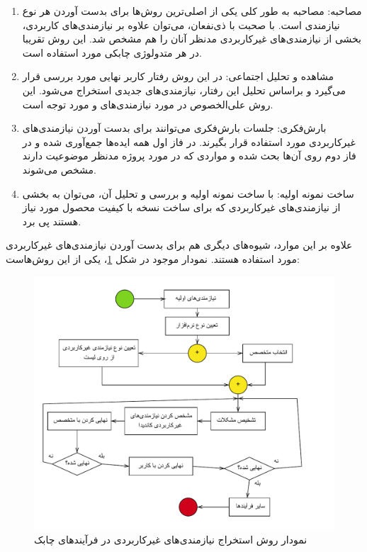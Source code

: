 {\begin{enumerate}[a)]
	\begin{enumerate}[1]
		\item 
		مصاحبه: مصاحبه به طور کلی یکی از اصلی‌ترین روش‌ها برای بدست آوردن هر نوع نیازمندی است. با صحبت با ذی‌نفعان، می‌توان علاوه بر نیازمندی‌های کاربردی، بخشی از نیازمندی‌های غیرکاربردی مدنظر آنان را هم مشخص شد. این روش تقریبا در هر متدولوژی چابکی مورد استفاده است.
		
		\item 
		مشاهده و تحلیل اجتماعی: در این روش رفتار کاربر نهایی مورد بررسی قرار می‌گیرد و براساس تحلیل این رفتار، نیازمندی‌های جدیدی استخراج می‌شود. این روش علی‌الخصوص در مورد نیازمندی‌های  و  مورد توجه است.
		
		\item
		بارش‌فکری: جلسات بارش‌فکری می‌توانند برای بدست آوردن نیازمندی‌های غیرکاربردی مورد استفاده قرار بگیرند. در فاز اول همه ایده‌ها جمع‌آوری شده و در فاز دوم روی آن‌ها بحث شده و مواردی که در مورد پروژه مدنظر موضوعیت دارند مشخص می‌شوند.
		
		\item
		ساخت‌ نمونه اولیه: با ساخت نمونه اولیه  و بررسی و تحلیل آن، می‌توان به بخشی از نیازمندی‌های غیرکاربردی که برای ساخت نسخه با کیفیت محصول مورد نیاز هستند پی برد.
		
	
	\end{enumerate}

علاوه بر این موارد، شیوه‌های دیگری هم برای بدست آوردن نیازمندی‌های غیرکاربردی مورد استفاده هستند. نمودار موجود در شکل \ref{fig1}، یکی از این روش‌هاست:



\begin{center}
	\begin{figure}
		
			\includegraphics[scale=1.0]{figs/1-1.pdf}
	\caption{نمودار روش استخراج نیازمندی‌های غیرکاربردی در فرآیند‌های چابک \cite{guideline}}	
	\label{fig1}
\end{figure}


\end{center}
\end{enumerate}}

